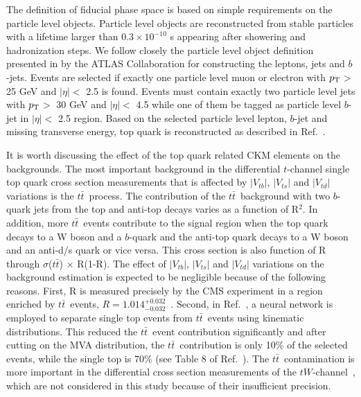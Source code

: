 \documentclass[11pt]{article}
\newcommand{\VTD}{|V_{td}|}
\newcommand{\VTS}{|V_{ts}|}
\newcommand{\VTB}{|V_{tb}|}
\newcommand{\pt}{$p_{\rm T}$}
\newcommand{\ttbar}{$t\bar{t}$~}
\begin{document}
The definition of fiducial phase space is based on simple requirements  on the particle level objects. Particle level objects are reconstructed from stable particles with a lifetime larger than $0.3 \times 10^{-10}$ s appearing  after showering and hadronization steps. We follow closely the particle level object definition  presented in \cite{Aaboud:2017pdi} by the ATLAS Collaboration for constructing the leptons, jets and $b$-jets. Events are selected if exactly one particle level muon or electron with \pt $>$ 25 GeV and $|\eta| <$ 2.5 is found. Events must contain exactly two particle level jets with \pt $>$ 30 GeV and $|\eta| <$ 4.5 while one of them be tagged as particle level $b$-jet in $|\eta| <$ 2.5 region. Based on the selected particle level lepton, $b$-jet and missing transverse energy, top quark is reconstructed as described in Ref.~\cite{Aaboud:2017pdi}.

It is worth discussing the effect of the top quark related CKM elements on the backgrounds.
The most important background in the differential $t$-channel single top quark cross section measurements that is affected by $\VTB$, $\VTS$ and $\VTD$ variations is the \ttbar process.
The contribution of the \ttbar background with two $b$-quark jets from the top and anti-top decays varies as a function of R$^2$. In addition, more \ttbar events contribute to the signal region when the top quark decays to a W boson and a $b$-quark and the anti-top quark decays to a W boson and an anti-d/s quark or vice versa. This cross section is also function of R through $\sigma$($t\bar{t}$) $\times$ R(1-R).
The effect of $\VTB$, $\VTS$ and $\VTD$ variations on the background estimation   is expected to be negligible because of the following reasons. First, R is measured precisely by the CMS experiment in a region enriched by \ttbar events, $R = 1.014^{+0.032}_{-0.032}$~\cite{Khachatryan:2014nda}. Second, in Ref.~\cite{Aaboud:2017pdi}, a neural network is employed to separate single top events from \ttbar events using kinematic distributions. This  reduced the \ttbar event contribution significantly and after cutting on the MVA distribution, the \ttbar contribution is only 10\% of the selected events, while the single top is 70\% (see Table 8 of Ref.~\cite{Aaboud:2017pdi}). The \ttbar contamination is  more important in the differential cross section measurements of the $tW$-channel~\cite{Aaboud:2017qyi}, which are not considered in this study because of their insufficient precision.
\end{document}
